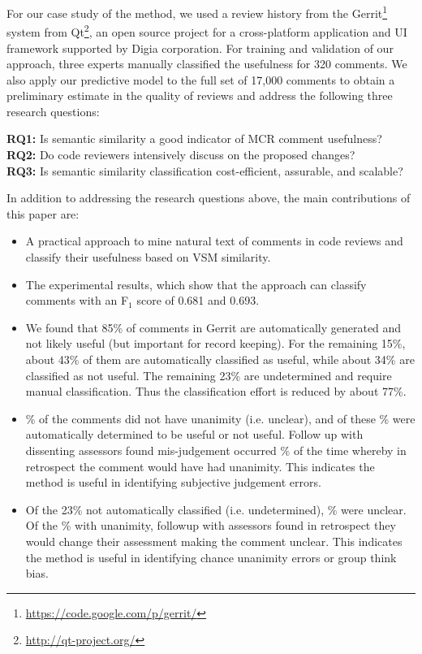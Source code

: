 For our case study of the method, we used a review history from the Gerrit\footnote{\url{https://code.google.com/p/gerrit/}} system from Qt\footnote{\url{http://qt-project.org/}}, an open source project for a cross-platform application and UI framework supported by Digia corporation.
For training and validation of our approach, three experts manually classified the usefulness for 320 comments.
We also apply our predictive model to the full set of 17,000 
comments to obtain a preliminary estimate in the quality of reviews and address the following three research questions:

\noindent \textbf{RQ1:} Is semantic similarity a good indicator of MCR comment usefulness?\\
\noindent \textbf{RQ2:} Do code reviewers intensively discuss on the proposed changes?\\
\noindent \textbf{RQ3:} Is semantic similarity classification cost-efficient, assurable, and scalable?

\noindent In addition to addressing the research questions above, the main contributions of this paper are:
\begin{itemize}
\item A practical approach to mine natural text of comments in code reviews and classify their usefulness based on VSM similarity.
\item The experimental results, which show that the approach can classify comments with an F$_1$ score of 0.681 and 0.693.
\item We found that 85\% of comments in Gerrit are automatically generated and not likely useful (but important for record keeping). For the remaining 15\%, about 43\% of them are automatically classified as useful, while about 34\% are classified as not useful. The remaining 23\% are undetermined and require manual classification. Thus the classification effort is reduced by about 77\%.
\item {}\% of the comments did not have unanimity (i.e. unclear), and of these \% were automatically determined to be useful or not useful. Follow up with dissenting assessors found mis-judgement occurred \% of the time whereby in retrospect the comment would have had unanimity. This indicates the method is useful in identifying subjective judgement errors. 
\item Of the 23\% not automatically classified (i.e. undetermined), \% were unclear. Of the \% with unanimity, followup with assessors found in retrospect they would change their assessment making the comment unclear. This indicates the method is useful in identifying chance unanimity errors or group think bias.
\end{itemize} 

